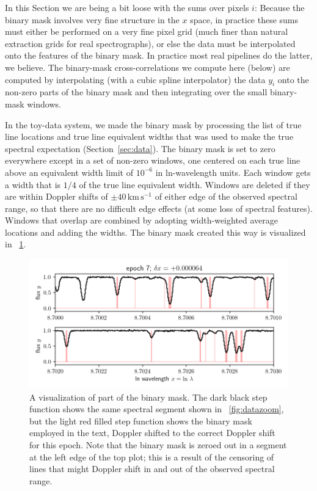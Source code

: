 \documentclass[modern]{aastex631}
\newcommand{\unit}[1]{\mathrm{#1}}
\newcommand{\km}{\unit{km}}
\newcommand{\s}{\unit{s}}
\newcommand{\kmps}{\km\,\s^{-1}}
\newcommand{\sectionname}{Section}
\newcommand{\secref}[1]{\sectionname~\ref{#1}}
\newcommand{\figref}[1]{\figurename~\ref{#1}}
\begin{document}
In this \sectionname{} we are being a bit loose with the sums over pixels $i$:
Because the binary mask involves very fine structure in the $x$ space, in practice these sums must either be performed on a very fine pixel grid (much finer than natural extraction grids for real spectrographs), or else the data must be interpolated onto the features of the binary mask.
In practice most real pipelines do the latter, we believe.
The binary-mask cross-correlations we compute here (below) are computed by interpolating (with a cubic spline interpolator) the data $y_i$ onto the non-zero parts of the binary mask and then integrating over the small binary-mask windows.

In the toy-data system, we made the binary mask by processing the list of true line locations and true line equivalent widths that was used to make the true spectral expectation (\secref{sec:data}).
The binary mask is set to zero everywhere except in a set of non-zero windows, one centered on each true line above an equivalent width limit of $10^{-6}$ in ln-wavelength units.
Each window gets a width that is $1/4$ of the true line equivalent width.
Windows are deleted if they are within Doppler shifts of $\pm 40\,\kmps$ of either edge of the observed spectral range, so that there are no difficult edge effects (at some loss of spectral features).
Windows that overlap are combined by adopting width-weighted average locations and adding the widths.
The binary mask created this way is visualized in \figref{fig:binarymask}.

\begin{figure}[tp]
  \begin{mdframed}
    \begin{center}
    \includegraphics[width=\textwidth]{../notebook/binarymask.png}
    \end{center}
    \caption{A visualization of part of the binary mask. The dark black step function shows the same spectral segment shown in \figref{fig:datazoom}, but the light red filled step function shows the binary mask employed in the text, Doppler shifted to the correct Doppler shift for this epoch. Note that the binary mask is zeroed out in a segment at the left edge of the top plot; this is a result of the censoring of lines that might Doppler shift in and out of the observed spectral range.\label{fig:binarymask}}
  \end{mdframed}
\end{figure}
\end{document}
